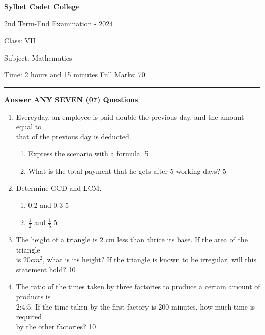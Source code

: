 \documentclass{exam}
\begin{document}
\begin{center}
  \bfseries\large
  Sylhet Cadet College

\normalsize
2nd Term-End Examination - 2024

  Class: VII
  
  Subject: Mathematics

  Time: 2 hours and 15 minutes \qquad \qquad  \qquad \qquad \qquad  \qquad \qquad  \qquad Full Marks: 70 
  
  \noindent\rule{16cm}{0.4pt}
  
  \textbf{Answer ANY SEVEN (07) Questions}
  
  \begin{enumerate}
  
  \item Evereyday, an employee is paid double the previous day, and the amount 
  equal to \\ that of the previous day is deducted. 
  
  \begin{enumerate}

    \item Express the scenario with a formula. \hfill 5
    \item What is the total payment that he gets after 5 working days? \hfill 5

\end{enumerate}

\item Determine GCD and LCM.

\begin{enumerate}

\item 0.2 and 0.3 \hfill 5
\item $\frac 12$ and $\frac 15$ \hfill 5

\end{enumerate}


  
  \item The height of a triangle is 2 cm less than thrice its base. If the area
  of the triangle \\ is $20 cm^2$, what is its height? If the triangle is known
  to be irregular, will this statement hold? \hfill 10
  
  \item The ratio of the times taken by three factories to produce a certain amount
  of products is \\ 2:4:5. If the time taken by the first factory is 200 minutes, 
  how much time is  required \\ by the  other  factories? \hfill 10
  

\end{enumerate}
\end{center}
\end{document}
